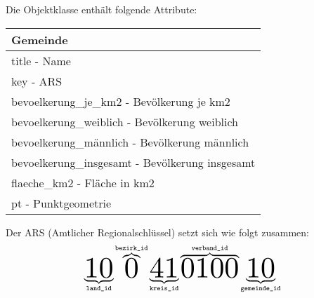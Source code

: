 \vspace{\baselineskip}\noindent
Die Objektklasse enthält folgende Attribute:
\begin{flushleft}
  \begin{tabular}{ || l || }
    \hline
    Gemeinde                                        \\
    \hline
    title - Name                                    \\
    key - ARS                                       \\
    bevoelkerung\_je\_km2 - Bevölkerung je km2      \\
    bevoelkerung\_weiblich - Bevölkerung weiblich   \\
    bevoelkerung\_männlich - Bevölkerung männlich   \\
    bevoelkerung\_insgesamt - Bevölkerung insgesamt \\
    flaeche\_km2 - Fläche in km2                    \\
    pt - Punktgeometrie                             \\
    \hline
  \end{tabular}
\end{flushleft}

\vspace{\baselineskip}\noindent
Der ARS (Amtlicher Regionalschlüssel) setzt sich wie folgt zusammen:
\[
  \underbrace{\scalebox{3}{10}}_{\texttt{land\_id}}\overbrace{\scalebox{3}{0}}^{\texttt{bezirk\_id}}\underbrace{\scalebox{3}{41}}_{\texttt{kreis\_id}}\overbrace{\scalebox{3}{0100}}^{\texttt{verband\_id}}\underbrace{\scalebox{3}{10}}_{\texttt{gemeinde\_id}}
\]

\clearpage

